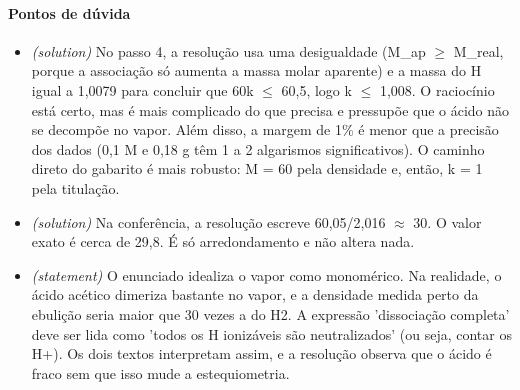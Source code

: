 \documentclass{article}%
\begin{document}
\paragraph{Pontos de dúvida}%
\begin{itemize}%
\item%
\textit{(solution)} No passo 4, a resolução usa uma desigualdade (M\_ap $\geq$ M\_real, porque a associação só aumenta a massa molar aparente) e a massa do H igual a 1,0079 para concluir que 60k $\leq$ 60,5, logo k $\leq$ 1,008. O raciocínio está certo, mas é mais complicado do que precisa e pressupõe que o ácido não se decompõe no vapor. Além disso, a margem de 1\% é menor que a precisão dos dados (0,1 M e 0,18 g têm 1 a 2 algarismos significativos). O caminho direto do gabarito é mais robusto: M = 60 pela densidade e, então, k = 1 pela titulação.%
\item%
\textit{(solution)} Na conferência, a resolução escreve 60,05/2,016 $\approx$ 30. O valor exato é cerca de 29,8. É só arredondamento e não altera nada.%
\item%
\textit{(statement)} O enunciado idealiza o vapor como monomérico. Na realidade, o ácido acético dimeriza bastante no vapor, e a densidade medida perto da ebulição seria maior que 30 vezes a do H2. A expressão 'dissociação completa' deve ser lida como 'todos os H ionizáveis são neutralizados' (ou seja, contar os H+). Os dois textos interpretam assim, e a resolução observa que o ácido é fraco sem que isso mude a estequiometria.%
\end{itemize}%
\end{document}
